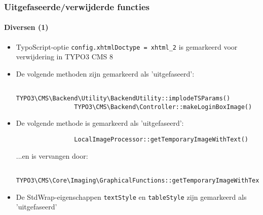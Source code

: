 \begin{frame}[fragile]
	\frametitle{Uitgefaseerde/verwijderde functies}
	\framesubtitle{Diversen (1)}

	\begin{itemize}
		\item TypoScript-optie \texttt{config.xhtmlDoctype = xhtml\_2} is gemarkeerd voor verwijdering in TYPO3 CMS 8

		\item De volgende methoden zijn gemarkeerd als 'uitgefaseerd':
			\begin{lstlisting}
				TYPO3\CMS\Backend\Utility\BackendUtility::implodeTSParams()
				TYPO3\CMS\Backend\Controller::makeLoginBoxImage()
			\end{lstlisting}

		\item De volgende methode is gemarkeerd als 'uitgefaseerd':
			\begin{lstlisting}
				LocalImageProcessor::getTemporaryImageWithText()
			\end{lstlisting}

			...en is vervangen door:

			\begin{lstlisting}
				TYPO3\CMS\Core\Imaging\GraphicalFunctions::getTemporaryImageWithText()
			\end{lstlisting}

		\item De StdWrap-eigenschappen \texttt{textStyle} en \texttt{tableStyle} zijn gemarkeerd als 'uitgefaseerd'

	\end{itemize}

\end{frame}


